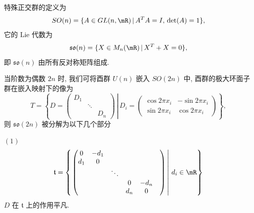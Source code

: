 \begin{example}[偶数阶特殊正交群 $SO(2n)$]
    特殊正交群的定义为
    \begin{equation*}
        SO(n) = \{A\in GL(n,\mR)\,|\,A^T A=I,\,\det(A)=1\},
    \end{equation*}
    它的 $\mathrm{Lie}$ 代数为
    \begin{equation*}
        \mathfrak{so}(n) = \{X\in M_{n}(\mR)\,|\,X^T + X = 0\},
    \end{equation*}
    即 $\mathfrak{so}(n)$ 由所有反对称矩阵组成.

    当阶数为偶数 $2n$ 时, 我们可将酉群 $U(n)$ 嵌入 $SO(2n)$ 中, 
    酉群的极大环面子群在嵌入映射下的像为
    \begin{equation*}
        T = 
        \left\{
            D = \left.
            \begin{pmatrix}
                D_1 & & \\
                & \ddots & \\
                & & D_n
            \end{pmatrix} \,\right|\, 
            D_i = 
            \begin{pmatrix}
                \cos 2\pi x_i & -\sin 2\pi x_i \\
                \sin 2\pi x_i & \cos 2\pi x_i
            \end{pmatrix}
        \right\},
    \end{equation*}
    则 $\mathfrak{so}(2n)$ 被分解为以下几个部分

    \noindent $(1)$
    \begin{equation*}
        \mathfrak{t} = 
        \left\{
            \left.
            \begin{pmatrix}
                0 & -d_1 & & & & \\
                d_1 & 0 & & & & \\
                 & & \ddots & & & \\
                 & & & 0 & -d_n & \\
                 & & & d_n & 0 &
            \end{pmatrix} \,\right|\, d_i\in\mR
        \right\}
    \end{equation*}
    $D$ 在 $\mathfrak{t}$ 上的作用平凡.


\end{example}
